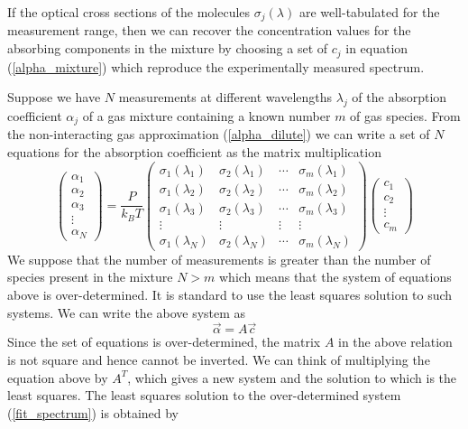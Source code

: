 \documentclass[8pt,a4paper]{report}
\begin{document}
	If the optical cross sections of the molecules $\sigma_j(\lambda)$ are well-tabulated for the measurement range, then we can recover the concentration values for the absorbing components in the mixture by choosing a set of $c_j$ in equation (\ref{alpha_mixture}) which reproduce the experimentally measured spectrum.
	
	Suppose we have $N$ measurements at different wavelengths $\lambda_j$ of the absorption coefficient $\alpha_j$ of a gas mixture containing a known number $m$ of gas species. From the non-interacting gas approximation (\ref{alpha_dilute}) we can write a set of $N$ equations for the absorption coefficient as the matrix multiplication
	\begin{equation} \label{fit_spectrum}
		\begin{pmatrix}
			\alpha_1 \\
			\alpha_2 \\
			\alpha_3 \\
			\vdots \\
			\alpha_N
		\end{pmatrix} =
		\frac{P}{k_B T}
		\begin{pmatrix}
			\sigma_1(\lambda_1) &  \sigma_2(\lambda_1) & \cdots & \sigma_m(\lambda_1) \\
			\sigma_1(\lambda_2) &  \sigma_2(\lambda_2) & \cdots & \sigma_m(\lambda_2) \\
			\sigma_1(\lambda_3) &  \sigma_2(\lambda_3) & \cdots & \sigma_m(\lambda_3) \\
			\vdots & \vdots& \vdots & \vdots \\
			\sigma_1(\lambda_N) & \sigma_2(\lambda_N) & \cdots &  \sigma_m(\lambda_N)
		\end{pmatrix}
		\begin{pmatrix}
			c_1 \\
			c_2 \\
			\vdots \\
			c_m
		\end{pmatrix}
	\end{equation}
	We suppose that the number of measurements is greater than the number of species present in the mixture $N > m$ which means that the system of equations above is over-determined. It is standard to use the least squares solution to such systems. We can write the above system as
	\begin{equation}
		\vec{\alpha} = A \vec{c}
	\end{equation}
	Since the set of equations is over-determined, the matrix $A$ in the above relation is not square and hence cannot be inverted. We can think of multiplying the equation above by $A^T$, which gives a new system and the solution to which is the least squares. The least squares solution to the over-determined system (\ref{fit_spectrum}) is obtained by
\end{document}
